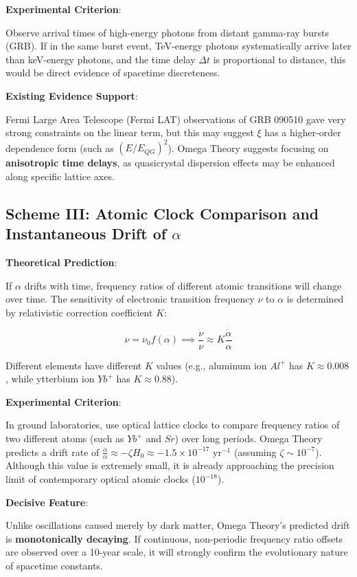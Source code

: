 \textbf{Experimental Criterion}:

Observe arrival times of high-energy photons from distant gamma-ray bursts (GRB). If in the same burst event, TeV-energy photons systematically arrive later than keV-energy photons, and the time delay $\Delta t$ is proportional to distance, this would be direct evidence of spacetime discreteness.

\textbf{Existing Evidence Support}:

Fermi Large Area Telescope (Fermi LAT) observations of GRB 090510 gave very strong constraints on the linear term, but this may suggest $\xi$ has a higher-order dependence form (such as $(E/E_{QG})^2$). Omega Theory suggests focusing on \textbf{anisotropic time delays}, as quasicrystal dispersion effects may be enhanced along specific lattice axes.

\subsection{Scheme III: Atomic Clock Comparison and Instantaneous Drift of \texorpdfstring{$\alpha$}{alpha}}

\textbf{Theoretical Prediction}:

If $\alpha$ drifts with time, frequency ratios of different atomic transitions will change over time.
The sensitivity of electronic transition frequency $\nu$ to $\alpha$ is determined by relativistic correction coefficient $K$:

\[\nu = \nu_0 f(\alpha) \implies \frac{\dot{\nu}}{\nu} \approx K \frac{\dot{\alpha}}{\alpha}\]

Different elements have different $K$ values (e.g., aluminum ion $Al^+$ has $K \approx 0.008$, while ytterbium ion $Yb^+$ has $K \approx 0.88$).

\textbf{Experimental Criterion}:

In ground laboratories, use optical lattice clocks to compare frequency ratios of two different atoms (such as $Yb^+$ and $Sr$) over long periods.
Omega Theory predicts a drift rate of $\frac{\dot{\alpha}}{\alpha} \approx -\zeta H_0 \approx -1.5 \times 10^{-17} \text{ yr}^{-1}$ (assuming $\zeta \sim 10^{-7}$). Although this value is extremely small, it is already approaching the precision limit of contemporary optical atomic clocks ($10^{-18}$).

\textbf{Decisive Feature}:

Unlike oscillations caused merely by dark matter, Omega Theory's predicted drift is \textbf{monotonically decaying}. If continuous, non-periodic frequency ratio offsets are observed over a 10-year scale, it will strongly confirm the evolutionary nature of spacetime constants.

